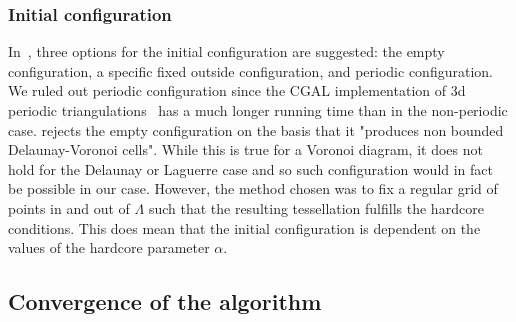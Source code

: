 \subsubsection{Initial configuration}
In~\cite{DereudreLavancier2011}, three options for the initial configuration are suggested: the empty configuration, a specific fixed outside configuration, and periodic configuration.
We ruled out periodic configuration since the CGAL implementation of 3d periodic triangulations~\cite{cgal:3d-period} has a much longer running time than in the non-periodic case. 
\cite{DereudreLavancier2011} rejects the empty configuration on the basis that it "produces non bounded Delaunay-Voronoi cells". While this is true for a Voronoi diagram, it does not hold for the Delaunay or Laguerre case and so such configuration would in fact be possible in our case.
However, the method chosen was to fix a regular grid of points in and out of $\Lambda$ such that the resulting tessellation fulfills the hardcore conditions. This does mean that the initial configuration is dependent on the values of the hardcore parameter $\alpha$. 



\subsection{Convergence of the algorithm}
\tbd
